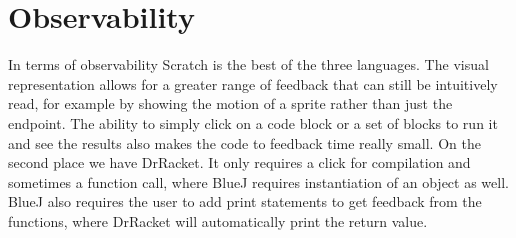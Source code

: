\section{Observability}
\label{sec:observability}
In terms of observability Scratch is the best of the three languages.
The visual representation allows for a greater range of feedback that can still be intuitively read, for example by showing the motion of a sprite rather than just the endpoint.
The ability to simply click on a code block or a set of blocks to run it and see the results also makes the code to feedback time really small.
On the second place we have DrRacket.
It only requires a click for compilation and sometimes a function call, where BlueJ requires instantiation of an object as well.
BlueJ also requires the user to add print statements to get feedback from the functions, where DrRacket will automatically print the return value.